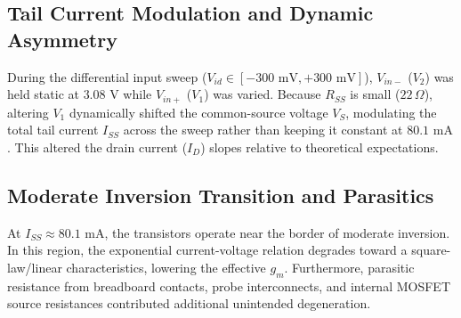 \documentclass[11pt,a4paper]{article}
\begin{document}
\subsection{Tail Current Modulation and Dynamic Asymmetry}
During the differential input sweep ($V_{id} \in [-300\text{ mV}, +300\text{ mV}]$), $V_{in-}$ ($V_2$) was held static at $3.08\text{ V}$ while $V_{in+}$ ($V_1$) was varied. Because $R_{SS}$ is small ($22\,\Omega$), altering $V_1$ dynamically shifted the common-source voltage $V_S$, modulating the total tail current $I_{SS}$ across the sweep rather than keeping it constant at $80.1\text{ mA}$. This altered the drain current ($I_D$) slopes relative to theoretical expectations.

\subsection{Moderate Inversion Transition and Parasitics}
At $I_{SS} \approx 80.1\text{ mA}$, the transistors operate near the border of moderate inversion. In this region, the exponential current-voltage relation degrades toward a square-law/linear characteristics, lowering the effective $g_m$. Furthermore, parasitic resistance from breadboard contacts, probe interconnects, and internal MOSFET source resistances contributed additional unintended degeneration.
\end{document}
